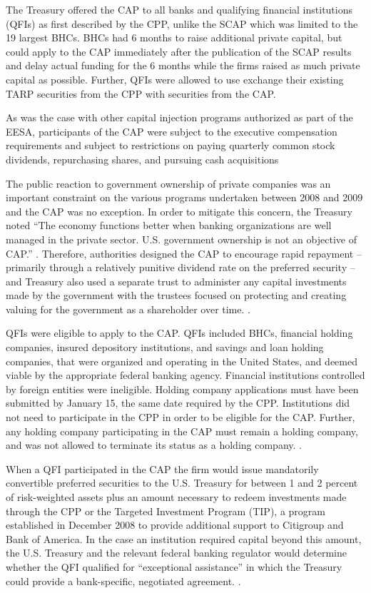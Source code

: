 \documentclass[12pt]{article}
\begin{document}
The Treasury offered the CAP to all banks and qualifying financial institutions (QFIs) as first described by the CPP, unlike the SCAP which was limited to the 19 largest BHCs. BHCs had 6 months to raise additional private capital, but could apply to the CAP immediately after the publication of the SCAP results and delay actual funding for the 6 months while the firms raised as much private capital as possible. Further, QFIs were allowed to use exchange their existing TARP securities from the CPP with securities from the CAP.

As was the case with other capital injection programs authorized as part of the EESA, participants of the CAP were subject to the executive compensation requirements and subject to restrictions on paying quarterly common stock dividends, repurchasing shares, and pursuing cash acquisitions

The public reaction to government ownership of private companies was an important constraint on the various programs undertaken between 2008 and 2009 and the CAP was no exception. In order to mitigate this concern, the Treasury noted ``The economy functions better when banking organizations are well managed in the private sector. U.S. government ownership is not an objective of CAP.'' \citep{WhitePaper}. Therefore, authorities designed the CAP to encourage rapid repayment -- primarily through a relatively punitive dividend rate on the preferred security -- and Treasury also used a separate trust to administer any capital investments made by the government with the trustees focused on protecting and creating valuing for the government as a shareholder over time. \citep{WhitePaper}.

QFIs were eligible to apply to the CAP. QFIs included BHCs, financial holding companies, insured depository institutions, and savings and loan holding companies, that were organized and operating in the United States, and deemed viable by the appropriate federal banking agency. Financial institutions controlled by foreign entities were ineligible. Holding company applications must have been submitted by January 15, the same date required by the CPP. Institutions did not need to participate in the CPP in order to be eligible for the CAP. Further, any holding company participating in the CAP must remain a holding company, and was not allowed to terminate its status as a holding company. \citep{WhitePaper}.

When a QFI participated in the CAP the firm would issue mandatorily convertible preferred securities to the U.S. Treasury for between 1 and 2 percent of risk-weighted assets plus an amount necessary to redeem investments made through the CPP or the Targeted Investment Program (TIP), a program established in December 2008 to provide additional support to Citigroup and Bank of America. In the case an institution required capital beyond this amount, the U.S. Treasury and the relevant federal banking regulator would determine whether the QFI qualified for ``exceptional assistance'' in which the Treasury could provide a bank-specific, negotiated agreement. \citep{WhitePaper}.
\end{document}
